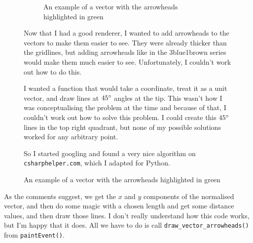 \documentclass[../development.tex]{subfiles}
\begin{document}
\begin{figure}[H]
	\hspace{0.005\linewidth}
	\centering
	\begin{minipage}{0.40\linewidth}
		\centering
		\begin{figure}[H]
			\centering
			\caption{An example of a vector with the arrowheads highlighted in green}
			\label{tikz:development:improving-the-gui:adding-vector-arrowheads}
		\end{figure}
	\end{minipage}%
	\hspace{0.015\linewidth}
	\begin{minipage}{0.56\linewidth}\setspacing
		Now that I had a good renderer, I wanted to add arrowheads to the vectors to make them easier to see. They were already thicker than the gridlines, but adding arrowheads like in the 3blue1brown series would make them much easier to see. Unfortunately, I couldn't work out how to do this.

		I wanted a function that would take a coordinate, treat it as a unit vector, and draw lines at $45\degree$ angles at the tip. This wasn't how I was conceptualising the problem at the time and because of that, I couldn't work out how to solve this problem. I could create this $45\degree$ lines in the top right quadrant, but none of my possible solutions worked for any arbitrary point.

		So I started googling and found a very nice algorithm on \texttt{csharphelper.com}\cite{csharphelper-arrowheads}, which I adapted for Python.
	\end{minipage}
	\hspace{0.005\linewidth}
	\vspace{-1em}
\end{figure}


As the comments suggest, we get the $x$ and $y$ components of the normalised vector, and then do some magic with a chosen length and get some distance values, and then draw those lines. I don't really understand how this code works, but I'm happy that it does. All we have to do is call \texttt{draw_vector_arrowheads()} from \texttt{paintEvent()}.
\end{document}
